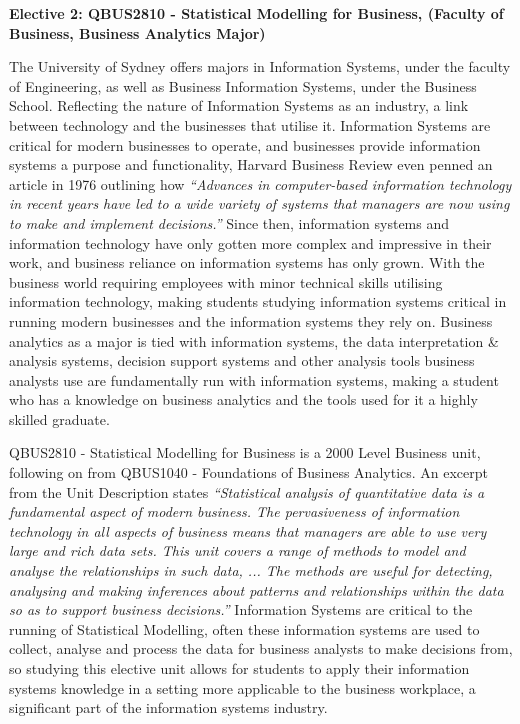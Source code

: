 \textbf{Elective 2: QBUS2810 - Statistical Modelling for Business, (Faculty of Business, Business Analytics Major)}

The University of Sydney offers majors in Information Systems, under the faculty of Engineering, as well as Business Information Systems, under the Business School. Reflecting the nature of Information Systems as an industry, a link between technology and the businesses that utilise it. Information Systems are critical for modern businesses to operate, and businesses provide information systems a purpose and functionality, Harvard Business Review even penned an article in 1976 outlining how \textit{“Advances in computer-based information technology in recent years have led to a wide variety of systems that managers are now using to make and implement decisions.”} \cite{brynjolfsson}  Since then, information systems and information technology have only gotten more complex and impressive in their work, and business reliance on information systems has only grown. With the business world requiring employees with minor technical skills utilising information technology, making students studying information systems critical in running modern businesses and the information systems they rely on. Business analytics as a major is tied with information systems, the data interpretation & analysis systems, decision support systems and other analysis tools business analysts use are fundamentally run with information systems, making a student who has a knowledge on business analytics and the tools used for it a highly skilled graduate.

QBUS2810 - Statistical Modelling for Business is a 2000 Level Business unit, following on from QBUS1040 - Foundations of Business Analytics. An excerpt from the Unit Description states \textit{“Statistical analysis of quantitative data is a fundamental aspect of modern business. The pervasiveness of information technology in all aspects of business means that managers are able to use very large and rich data sets. This unit covers a range of methods to model and analyse the relationships in such data, ... The methods are useful for detecting, analysing and making inferences about patterns and relationships within the data so as to support business decisions.”} \cite{Usyd6} Information Systems are critical to the running of Statistical Modelling, often these information systems are used to collect, analyse and process the data for business analysts to make decisions from, so studying this elective unit allows for students to apply their information systems knowledge in a setting more applicable to the business workplace, a significant part of the information systems industry. 

